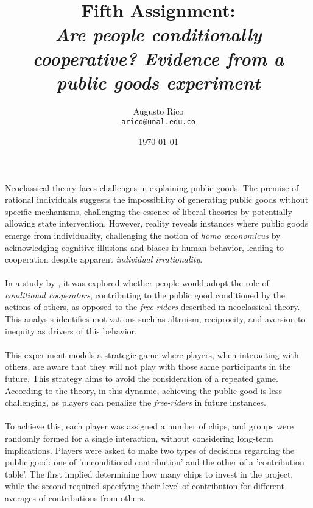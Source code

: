 \documentclass[11pt]{article}
\title{Fifth Assignment: \\\textbf{\textit{Are people conditionally cooperative? Evidence from a public goods experiment}}}
\author{Augusto Rico\\%
    \href{mailto:arico@unal.edu.co}{\texttt{arico@unal.edu.co}}
    }
\date{\today}
\begin{document}
\maketitle


\begin{flushleft}
    Neoclassical theory faces challenges in explaining public goods. The premise of rational individuals suggests the impossibility of generating public goods without specific mechanisms, challenging the essence of liberal theories by potentially allowing state intervention. However, reality reveals instances where public goods emerge from individuality, challenging the notion of \textit{homo œconomicus} by acknowledging cognitive illusions and biases in human behavior, leading to cooperation despite apparent \textit{individual irrationality}.\\~\\

    In a study by \citet{fischbacher2001people}, it was explored whether people would adopt the role of \textit{conditional cooperators}, contributing to the public good conditioned by the actions of others, as opposed to the \textit{free-riders} described in neoclassical theory. This analysis identifies motivations such as altruism, reciprocity, and aversion to inequity as drivers of this behavior.\\~\\

    This experiment models a strategic game where players, when interacting with others, are aware that they will not play with those same participants in the future. This strategy aims to avoid the consideration of a repeated game. According to the theory, in this dynamic, achieving the public good is less challenging, as players can penalize the \textit{free-riders} in future instances.\\~\\

    To achieve this, each player was assigned a number of chips, and groups were randomly formed for a single interaction, without considering long-term implications. Players were asked to make two types of decisions regarding the public good: one of 'unconditional contribution' and the other of a 'contribution table'. The first implied determining how many chips to invest in the project, while the second required specifying their level of contribution for different averages of contributions from others.\\~\\


\end{flushleft}
\end{document}
